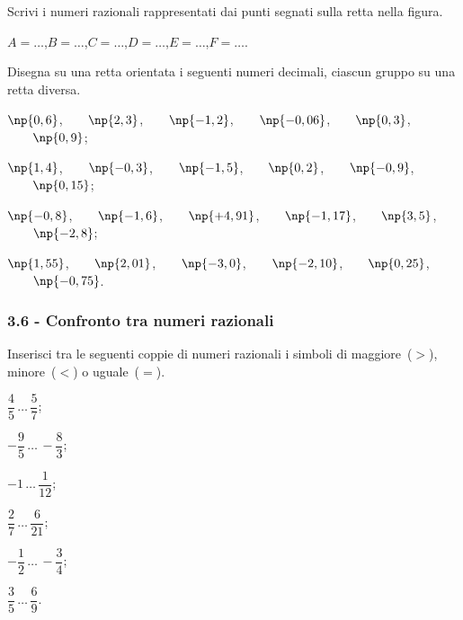 \begin{esercizio}
 \label{ese:3.34}
 Scrivi i numeri razionali rappresentati dai punti segnati sulla retta nella figura.
\begin{center}

\end{center}
$ A=\ldots $,\quad $ B=\ldots $,\quad $ C=\ldots $,\quad $ D=\ldots $,\quad $ E=\ldots $,\quad $ F=\ldots $.
\end{esercizio}

\begin{esercizio}
 \label{ese:3.35}
Disegna su una retta orientata i seguenti numeri decimali, ciascun gruppo su una retta diversa.
\begin{enumeratea}
 \item $\np{0,6}$,$\qquad\np{2,3}$,$\qquad\np{-1,2}$,$\qquad\np{-0,06}$,$\qquad\np{0,3}$,$\qquad\np{0,9}$;
 \item $\np{1,4}$,$\qquad\np{-0,3}$,$\qquad\np{-1,5}$,$\qquad\np{0,2}$,$\qquad\np{-0,9}$,$\qquad\np{0,15}$;
 \item $\np{-0,8}$,$\qquad\np{-1,6}$,$\qquad\np{+4,91}$,$\qquad\np{-1,17}$,$\qquad\np{3,5}$,$\qquad\np{-2,8}$;
 \item $\np{1,55}$,$\qquad\np{2,01}$,$\qquad\np{-3,0}$,$\qquad\np{-2,10}$,$\qquad\np{0,25}$,$\qquad\np{-0,75}$.
\end{enumeratea}
\end{esercizio}
\pagebreak
\subsubsection*{3.6 - Confronto tra numeri razionali}

\begin{esercizio}
 \label{ese:3.36}
Inserisci tra le seguenti coppie di numeri razionali i simboli di maggiore~($>$), minore~($<$) o uguale~($=$).
\begin{multicols}{3}
\begin{enumeratea}
\spazielenx
 \item $\dfrac{4}{5}\,\ldots\,\dfrac{5}{7}$;
 \item $-\dfrac{9}{5}\,\ldots\,-\dfrac{8}{3}$;
 \item $-1\,\ldots\,\dfrac{1}{12}$;
 \item $\dfrac{2}{7}\,\ldots\,\dfrac{6}{21}$;
 \item $-\dfrac{1}{2}\,\ldots\,-\dfrac{3}{4}$;
 \item $\dfrac{3}{5}\,\ldots\,\dfrac{6}{9}$.
\end{enumeratea}
\end{multicols}
\end{esercizio}

